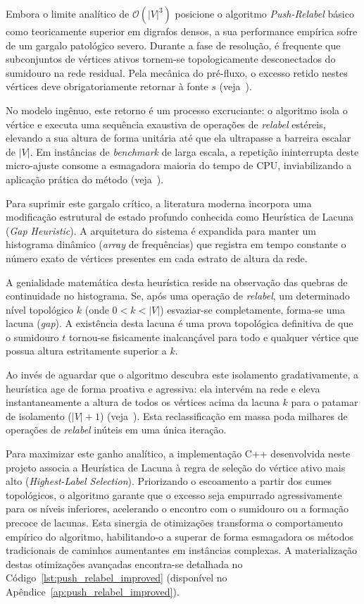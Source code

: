 \documentclass[12pt,a4paper]{article}
\begin{document}
Embora o limite analítico de $\mathcal{O}(|V|^3)$ posicione o algoritmo \textit{Push-Relabel} básico como teoricamente superior em digrafos densos, a sua performance empírica sofre de um gargalo patológico severo. Durante a fase de resolução, é frequente que subconjuntos de vértices ativos tornem-se topologicamente desconectados do sumidouro na rede residual. Pela mecânica do pré-fluxo, o excesso retido nestes vértices deve obrigatoriamente retornar à fonte $s$ (veja~\cite{ahuja1993network}).

No modelo ingênuo, este retorno é um processo excruciante: o algoritmo isola o vértice e executa uma sequência exaustiva de operações de \textit{relabel} estéreis, elevando a sua altura de forma unitária até que ela ultrapasse a barreira escalar de $|V|$. Em instâncias de \textit{benchmark} de larga escala, a repetição ininterrupta deste micro-ajuste consome a esmagadora maioria do tempo de CPU, inviabilizando a aplicação prática do método (veja~\cite{cook1998combinatorial}).

Para suprimir este gargalo crítico, a literatura moderna incorpora uma modificação estrutural de estado profundo conhecida como Heurística de Lacuna (\textit{Gap Heuristic}). A arquitetura do sistema é expandida para manter um histograma dinâmico (\textit{array} de frequências) que registra em tempo constante o número exato de vértices presentes em cada estrato de altura da rede.

A genialidade matemática desta heurística reside na observação das quebras de continuidade no histograma. Se, após uma operação de \textit{relabel}, um determinado nível topológico $k$ (onde $0 < k < |V|$) esvaziar-se completamente, forma-se uma lacuna (\textit{gap}). A existência desta lacuna é uma prova topológica definitiva de que o sumidouro $t$ tornou-se fisicamente inalcançável para todo e qualquer vértice que possua altura estritamente superior a $k$.

Ao invés de aguardar que o algoritmo descubra este isolamento gradativamente, a heurística age de forma proativa e agressiva: ela intervém na rede e eleva instantaneamente a altura de todos os vértices acima da lacuna $k$ para o patamar de isolamento ($|V| + 1$) (veja~\cite{korte2018combinatorial}). Esta reclassificação em massa poda milhares de operações de \textit{relabel} inúteis em uma única iteração.

Para maximizar este ganho analítico, a implementação C++ desenvolvida neste projeto associa a Heurística de Lacuna à regra de seleção do vértice ativo mais alto (\textit{Highest-Label Selection}). Priorizando o escoamento a partir dos cumes topológicos, o algoritmo garante que o excesso seja empurrado agressivamente para os níveis inferiores, acelerando o encontro com o sumidouro ou a formação precoce de lacunas. Esta sinergia de otimizações transforma o comportamento empírico do algoritmo, habilitando-o a superar de forma esmagadora os métodos tradicionais de caminhos aumentantes em instâncias complexas. A materialização destas otimizações avançadas encontra-se detalhada no Código~\ref{lst:push_relabel_improved} (disponível no Apêndice~\ref{ap:push_relabel_improved}).
\end{document}

